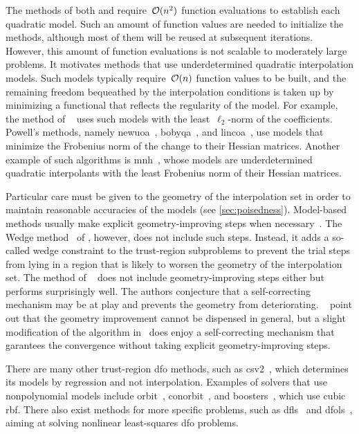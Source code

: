 The methods of both \citeauthor{Winfield_1969} and \citeauthor{Powell_2002} require~$\operatorname{\mathcal{O}}(n^2)$ function evaluations to establish each quadratic model.
Such an amount of function values are needed to initialize the methods, although most of them will be reused at subsequent iterations.
However, this amount of function evaluations is not scalable to moderately large problems.
It motivates methods that use underdetermined quadratic interpolation models.
Such models typically require~$\operatorname{\mathcal{O}}(n)$ function values to be built, and the remaining freedom bequeathed by the interpolation conditions is taken up by minimizing a functional that reflects the regularity of the model.
For example, the method of \citeauthor{Conn_Toint_1996}~\cite{Conn_Toint_1996} uses such models with the least~$\ell_2$-norm of the coefficients.
Powell's methods, namely \gls{newuoa}~\cite{Powell_2006}, \gls{bobyqa}~\cite{Powell_2009}, and \gls{lincoa}~\cite{Powell_2015}, use models that minimize the Frobenius norm of the change to their Hessian matrices.
Another example of such algorithms is \gls{mnh}~\cite{Wild_2008}, whose models are underdetermined quadratic interpolants with the least Frobenius norm of their Hessian matrices.

Particular care must be given to the geometry of the interpolation set in order to maintain reasonable accuracies of the models (see \cref{sec:poisedness}).
Model-based methods usually make explicit geometry-improving steps when necessary~\cite{Conn_Scheinberg_Vicente_2008a,Conn_Scheinberg_Vicente_2008b}.
The Wedge method~\cite{Marazzi_Nocedal_2002} of \citeauthor{Marazzi_Nocedal_2002}, however, does not include such steps.
Instead, it adds a so-called wedge constraint to the trust-region subproblems to prevent the trial steps from lying in a region that is likely to worsen the geometry of the interpolation set.
The method of \citeauthor{Fasano_Morales_Nocedal_2009}~\cite{Fasano_Morales_Nocedal_2009} does not include geometry-improving steps either but performs surprisingly well.
The authors conjecture that a self-correcting mechanism may be at play and prevents the geometry from deteriorating.
\citeauthor{Scheinberg_Toint_2010}~\cite{Scheinberg_Toint_2010} point out that the geometry improvement cannot be dispensed in general, but a slight modification of the algorithm in~\cite{Fasano_Morales_Nocedal_2009} does enjoy a self-correcting mechanism that garantees the convergence without taking explicit geometry-improving steps.

There are many other trust-region \gls{dfo} methods, such as \gls{csv2}~\cite{Billups_Larson_Graf_2013}, which determines its models by regression and not interpolation.
Examples of solvers that use nonpolynomial models include \gls{orbit}~\cite{Wild_Regis_Shoemaker_2008}, \gls{conorbit}~\cite{Regis_Wild_2017}, and \gls{boosters}~\cite{Oeuvray_Bierlaire_2009}, which use cubic \gls{rbf}.
There also exist methods for more specific problems, such as \gls{dfls}~\cite{Zhang_Conn_Scheinberg_2010} and \gls{dfols}~\cite{Cartis_Etal_2019}, aiming at solving nonlinear least-squares \gls{dfo} problems.

